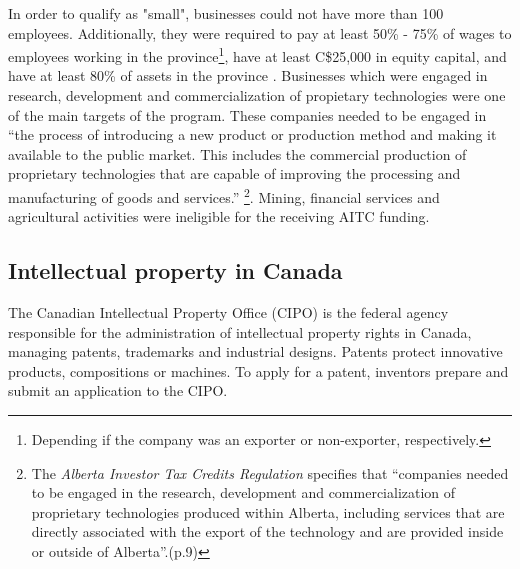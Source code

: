 \documentclass[../main.tex]{subfiles}
\begin{document}
In order to qualify as "small", businesses could not have more than 100 employees. Additionally, they were required to pay at least 50\% - 75\% of wages to employees working in the province\footnote{Depending if the company was an exporter or non-exporter, respectively.}, have at least C\$25,000 in equity capital, and have at least 80\% of assets in the province \parencite{albertaeconomicdevelopmentandtrade19}. Businesses which were engaged in research, development and commercialization of propietary technologies were one of the main targets of the program. These companies needed to be engaged in \enquote{the process of introducing a new product or production method and making it available to the public market. This includes the commercial production of proprietary technologies that are capable of improving the processing and manufacturing of goods and services.} \parencite[19]{albertaeconomicdevelopmentandtrade19}\footnote{The \textit{Alberta Investor Tax Credits Regulation}\nocite{Alberta19a} specifies that \enquote{companies needed to be engaged in the research, development and commercialization of proprietary technologies produced within Alberta, including services that are directly associated with the export of the technology and are provided inside or outside of Alberta}.(p.9)}. Mining, financial services and agricultural activities were ineligible for the receiving AITC funding.

\subsection{Intellectual property in Canada}

The Canadian Intellectual Property Office (CIPO) is the federal agency responsible for the administration of intellectual property rights in Canada, managing patents, trademarks and industrial designs. Patents protect innovative products, compositions or machines. To apply for a patent, inventors prepare and submit an application to the CIPO. 
\end{document}
